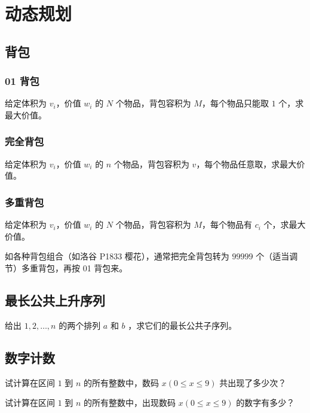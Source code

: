 
\chapter{动态规划}

\section{背包}

\subsection{01 背包}

给定体积为 $v_i$，价值 $w_i$ 的 $N$ 个物品，背包容积为 $M$，每个物品只能取 $1$ 个，求最大价值。



\subsection{完全背包}

给定体积为 $v_i$，价值 $w_i$ 的 $n$ 个物品，背包容积为 $v$，每个物品任意取，求最大价值。



\subsection{多重背包}

给定体积为 $v_i$，价值 $w_i$ 的 $N$ 个物品，背包容积为 $M$，每个物品有 $c_i$ 个，求最大价值。

如各种背包组合（如洛谷 P1833 樱花），通常把完全背包转为 $99999$ 个（适当调节）多重背包，再按 01 背包来。



\section{最长公共上升序列}

给出 $1,2,\ldots,n$ 的两个排列 $a$ 和 $b$ ，求它们的最长公共子序列。



\section{数字计数}

试计算在区间 $1$ 到 $n$ 的所有整数中，数码 $x(0 \leqslant x \leqslant 9)$ 共出现了多少次？



试计算在区间 $1$ 到 $n$ 的所有整数中，出现数码 $x(0 \leqslant x \leqslant 9)$ 的数字有多少？

